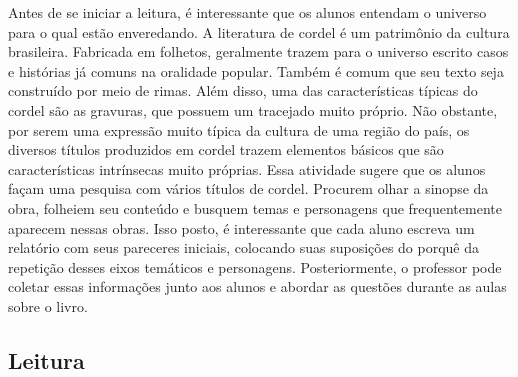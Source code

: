 \documentclass[12pt]{extarticle}
\begin{document}

Antes de se iniciar a leitura, é interessante que os alunos
entendam o universo para o qual estão enveredando. A literatura de
cordel é um patrimônio da cultura brasileira. Fabricada em folhetos,
geralmente trazem para o universo escrito casos e histórias já comuns na
oralidade popular. Também é comum que seu texto seja construído por meio
de rimas. Além disso, uma das características típicas do cordel são as
gravuras, que possuem um tracejado muito próprio. Não obstante, por
serem uma expressão muito típica da cultura de uma região do país, os
diversos títulos produzidos em cordel trazem elementos básicos que são
características intrínsecas muito próprias. Essa atividade sugere que os
alunos façam uma pesquisa com vários títulos de cordel. Procurem olhar a
sinopse da obra, folheiem seu conteúdo e busquem temas e personagens que
frequentemente aparecem nessas obras. Isso posto, é interessante que
cada aluno escreva um relatório com seus pareceres iniciais, colocando
suas suposições do porquê da repetição desses eixos temáticos e
personagens. Posteriormente, o professor pode coletar essas informações
junto aos alunos e abordar as questões durante as aulas sobre o livro.

\subsection{Leitura}
\end{document}
